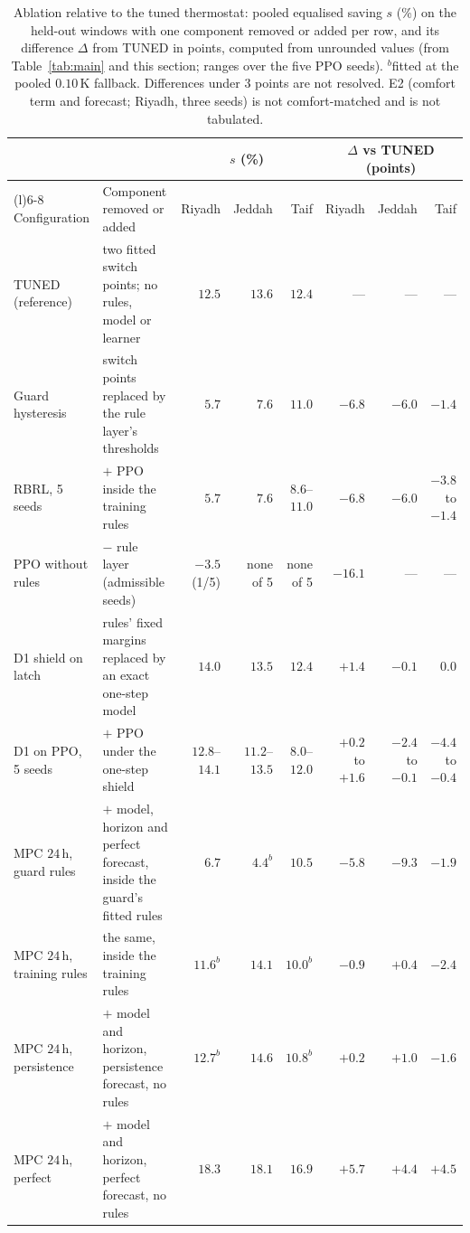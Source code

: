 \documentclass[pdflatex,sn-mathphys-num,iicol]{sn-jnl}
\theoremstyle{thmstyleone}\newtheorem{proposition}{Proposition}\newtheorem{corollary}{Corollary}
\theoremstyle{thmstyletwo}\newtheorem{remark}{Remark}\newtheorem{observation}{Observation}
\theoremstyle{thmstylethree}\newtheorem{definition}{Definition}
\begin{document}
\begin{table}[t]
\centering
\caption{Ablation relative to the tuned thermostat: pooled equalised saving
$s$ (\%) on the held-out windows with one component removed or added per row,
and its difference $\Delta$ from TUNED in points, computed from unrounded values
(from Table~\ref{tab:main} and this section; ranges over the five PPO seeds). $^{b}$fitted at the pooled $0.10\,$K fallback.
Differences under $3$ points are not resolved. E2 (comfort term and forecast;
Riyadh, three seeds) is not comfort-matched and is not tabulated.}
\label{tab:ablation}
\setlength{\tabcolsep}{3pt}
\footnotesize
\begin{tabularx}{\textwidth}{@{}>{\raggedright\arraybackslash}p{}>{\raggedright\arraybackslash}Xrrrrrr@{}}
\toprule
 & & \multicolumn{3}{c}{$s$ (\%)} & \multicolumn{3}{c}{$\Delta$ vs TUNED (points)} \\
\cmidrule(lr){3-5}\cmidrule(l){6-8}
Configuration & Component removed or added & Riyadh & Jeddah & Taif & Riyadh & Jeddah & Taif \\
\midrule
TUNED (reference) & two fitted switch points; no rules, model or learner & $12.5$ & $13.6$ & $12.4$ & --- & --- & --- \\
Guard hysteresis & switch points replaced by the rule layer's thresholds & $5.7$ & $7.6$ & $11.0$ & $-6.8$ & $-6.0$ & $-1.4$ \\
RBRL, 5 seeds & $+$ PPO inside the training rules & $5.7$ & $7.6$ & $8.6$--$11.0$ & $-6.8$ & $-6.0$ & $-3.8$ to $-1.4$ \\
PPO without rules & $-$ rule layer (admissible seeds) & $-3.5$ (1/5) & none of 5 & none of 5 & $-16.1$ & --- & --- \\
D1 shield on latch & rules' fixed margins replaced by an exact one-step model & $14.0$ & $13.5$ & $12.4$ & $+1.4$ & $-0.1$ & $0.0$ \\
D1 on PPO, 5 seeds & $+$ PPO under the one-step shield & $12.8$--$14.1$ & $11.2$--$13.5$ & $8.0$--$12.0$ & $+0.2$ to $+1.6$ & $-2.4$ to $-0.1$ & $-4.4$ to $-0.4$ \\
MPC $24\,$h, guard rules & $+$ model, horizon and perfect forecast, inside the guard's fitted rules & $6.7$ & $4.4^{b}$ & $10.5$ & $-5.8$ & $-9.3$ & $-1.9$ \\
MPC $24\,$h, training rules & the same, inside the training rules & $11.6^{b}$ & $14.1$ & $10.0^{b}$ & $-0.9$ & $+0.4$ & $-2.4$ \\
MPC $24\,$h, persistence & $+$ model and horizon, persistence forecast, no rules & $12.7^{b}$ & $14.6$ & $10.8^{b}$ & $+0.2$ & $+1.0$ & $-1.6$ \\
MPC $24\,$h, perfect & $+$ model and horizon, perfect forecast, no rules & $18.3$ & $18.1$ & $16.9$ & $+5.7$ & $+4.4$ & $+4.5$ \\
\bottomrule
\end{tabularx}
\end{table}
\end{document}
